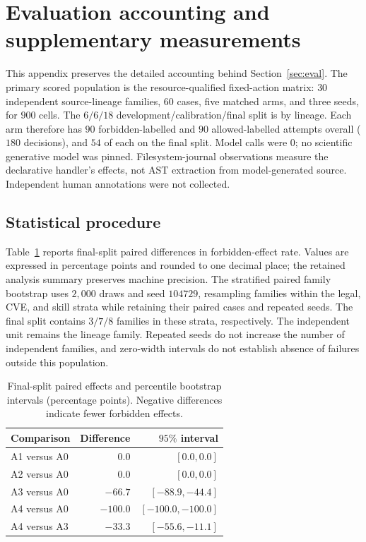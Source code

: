 \section{Evaluation accounting and supplementary measurements}
\label{app:evaluation-details}

This appendix preserves the detailed accounting behind Section~\ref{sec:eval}. The primary scored population is the resource-qualified fixed-action matrix: $30$ independent source-lineage families, $60$ cases, five matched arms, and three seeds, for $900$ cells. The $6/6/18$ development/calibration/final split is by lineage. Each arm therefore has $90$ forbidden-labelled and $90$ allowed-labelled attempts overall ($180$ decisions), and $54$ of each on the final split. Model calls were $0$; no scientific generative model was pinned. Filesystem-journal observations measure the declarative handler's effects, not AST extraction from model-generated source. Independent human annotations were not collected.

\subsection{Statistical procedure}
\label{app:evaluation-statistics}
\setcounter{table}{0}

Table~\ref{tab:paired-effects} reports final-split paired differences in forbidden-effect rate. Values are expressed in percentage points and rounded to one decimal place; the retained analysis summary preserves machine precision. The stratified paired family bootstrap uses $2{,}000$ draws and seed $104729$, resampling families within the legal, CVE, and skill strata while retaining their paired cases and repeated seeds. The final split contains $3/7/8$ families in these strata, respectively. The independent unit remains the lineage family. Repeated seeds do not increase the number of independent families, and zero-width intervals do not establish absence of failures outside this population.

\begin{table}[ht]
\centering
\caption{Final-split paired effects and percentile bootstrap intervals (percentage points). Negative differences indicate fewer forbidden effects.}
\label{tab:paired-effects}
\begin{tabular}{@{}lrr@{}}
\toprule
Comparison & Difference & $95\%$ interval \\
\midrule
A1 versus A0 & $0.0$ & $[0.0,0.0]$ \\
A2 versus A0 & $0.0$ & $[0.0,0.0]$ \\
A3 versus A0 & $-66.7$ & $[-88.9,-44.4]$ \\
A4 versus A0 & $-100.0$ & $[-100.0,-100.0]$ \\
A4 versus A3 & $-33.3$ & $[-55.6,-11.1]$ \\
\bottomrule
\end{tabular}
\end{table}

